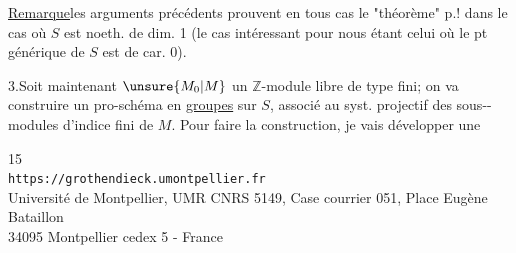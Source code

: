 \uline{Remarque}\quad les arguments précédents prouvent
en tous cas le "théorème"  p.!
dans le cas où $S$ est noeth. de dim. 1
(le cas intéressant pour nous étant celui où le pt générique de $S$
est de car. 0).


3.\quad Soit maintenant $\unsure{M_0|M}$ un $\mathbb Z$-module
libre de type fini; on va construire un
pro-schéma en \uline{groupes} sur $S$, associé
au syst. projectif des sous--modules
d'indice fini de $M$. Pour faire la
construction, je vais développer  une

\begin{center}
\small
15\\
\texttt{https://grothendieck.umontpellier.fr}\\
Université de Montpellier, UMR CNRS 5149, Case courrier 051, Place Eugène Bataillon\\
34095 Montpellier cedex 5 - France
\end{center}



